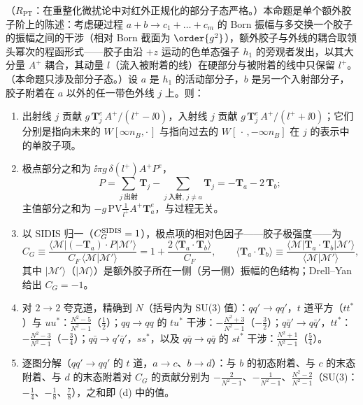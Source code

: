 \begin{proposition}\label{prop:break-colour}
（$R_{\mathrm{PT}}$：在重整化微扰论中对红外正规化的部分子态严格。）本命题是单个额外胶子阶上的陈述：考虑硬过程 $a+b\to c_1+\dots+c_m$ 的 Born 振幅与多交换一个胶子的振幅之间的干涉（相对 Born 截面为 $\order{g^2}$），额外胶子与外线的耦合取领头幂次的程函形式——胶子由沿 $+z$ 运动的色单态强子 $h_1$ 的旁观者发出，以其大分量 $A^+$ 耦合，其动量 $l$（流入被附着的线）在硬部分与被附着的线中只保留 $l^+$。（本命题只涉及部分子态。）设 $a$ 是 $h_1$ 的活动部分子，$b$ 是另一个入射部分子，胶子附着在 $a$ 以外的任一带色外线 $j$ 上。则：
\begin{enumerate}[label=(\alph*),leftmargin=2.2em,itemsep=1pt,topsep=2pt]
\item 出射线 $j$ 贡献 $g\,\mathbf T_j^e\,A^+/(l^+-\ii0)$，入射线 $j$ 贡献 $g\,\mathbf T_j^e\,A^+/(l^++\ii0)$；它们分别是指向未来的 $W[\infty n_B,\cdot\,]$ 与指向过去的 $W[\,\cdot\,,-\infty n_B]$ 在 $j$ 的表示中的单胶子项。
\item 极点部分之和为 $\ii\pi g\,\delta(l^+)A^+P^e$，
\begin{equation}\label{eq:break-P}
P=\sum_{j\ \text{出射}}\mathbf T_j-\sum_{j\ \text{入射},\,j\neq a}\mathbf T_j=-\mathbf T_a-2\,\mathbf T_b ;
\end{equation}
主值部分之和为 $-g\,\mathrm{PV}\frac{1}{l^+}A^+\mathbf T_a^e$，与过程无关。
\item 以 SIDIS 归一（$C_G^{\rm SIDIS}=1$），极点项的相对色因子——胶子极强度——为
\begin{equation}\label{eq:break-CG}
C_G\equiv\frac{\langle\mathcal M|(-\mathbf T_a)\cdot P|\mathcal M'\rangle}{C_F\,\langle\mathcal M|\mathcal M'\rangle}=1+\frac{2\,\langle\mathbf T_a\cdot\mathbf T_b\rangle}{C_F},\qquad
\langle\mathbf T_a\cdot\mathbf T_b\rangle\equiv\frac{\langle\mathcal M|\mathbf T_a\cdot\mathbf T_b|\mathcal M'\rangle}{\langle\mathcal M|\mathcal M'\rangle},
\end{equation}
其中 $|\mathcal M'\rangle$（$|\mathcal M\rangle$）是额外胶子所在一侧（另一侧）振幅的色结构；Drell--Yan 给出 $C_G=-1$。
\item 对 $2\to2$ 夸克道，精确到 $N$（括号内为 SU(3) 值）：$qq'\to qq'$，$t$ 道平方（$tt^*$）与 $uu^*$：$\frac{N^2-5}{N^2-1}$（$\frac12$）；$qq\to qq$ 的 $tu^*$ 干涉：$-\frac{N^2+3}{N^2-1}$（$-\frac32$）；$q\bar q'\to q\bar q'$，$tt^*$：$-\frac{N^2-3}{N^2-1}$（$-\frac34$）；$q\bar q\to q'\bar q'$，$ss^*$，以及 $q\bar q\to q\bar q$ 的 $st^*$ 干涉：$\frac{N^2+1}{N^2-1}$（$\frac54$）。
\item 逐图分解（$qq'\to qq'$ 的 $t$ 道，$a\to c$、$b\to d$）：与 $b$ 的初态附着、与 $c$ 的末态附着、与 $d$ 的末态附着对 $C_G$ 的贡献分别为 $-\frac{2}{N^2-1}$、$-\frac{1}{N^2-1}$、$\frac{N^2-2}{N^2-1}$（SU(3)：$-\frac14$、$-\frac18$、$\frac78$），之和即 (d) 中的值。
\end{enumerate}
\end{proposition}


